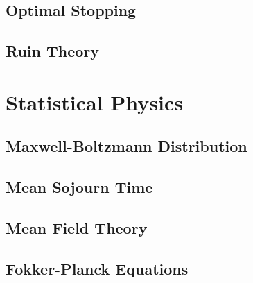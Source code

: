 \documentclass[11pt]{report} %
\begin{document}
\section{Optimal Stopping}

\section{Ruin Theory}

\chapter{Statistical Physics}

\section{Maxwell-Boltzmann Distribution}

\section{Mean Sojourn Time}

\section{Mean Field Theory}

\section{Fokker-Planck Equations}

{}

\end{document}
